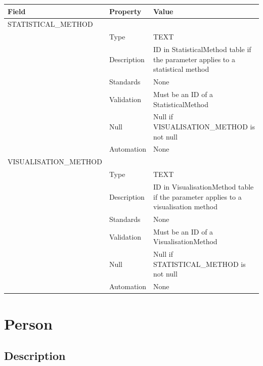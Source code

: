 \begin{longtable}[]{@{}
  >{\raggedright\arraybackslash}p{}
  >{\raggedright\arraybackslash}p{}
  >{\raggedright\arraybackslash}p{}@{}}
\toprule\noalign{}
\begin{minipage}[b]{\linewidth}\raggedright
Field
\end{minipage} & \begin{minipage}[b]{\linewidth}\raggedright
Property
\end{minipage} & \begin{minipage}[b]{\linewidth}\raggedright
Value
\end{minipage} \\
\midrule\noalign{}
\endhead
\bottomrule\noalign{}
\endlastfoot
STATISTICAL\_METHOD & & \\
& Type & TEXT \\
& Description & ID in StatisticalMethod table if the parameter applies
to a statistical method \\
& Standards & None \\
& Validation & Must be an ID of a StatisticalMethod \\
& Null & Null if VISUALISATION\_METHOD is not null \\
& Automation & None \\
VISUALISATION\_METHOD & & \\
& Type & TEXT \\
& Description & ID in VisualisationMethod table if the parameter applies
to a visualisation method \\
& Standards & None \\
& Validation & Must be an ID of a VisualisationMethod \\
& Null & Null if STATISTICAL\_METHOD is not null \\
& Automation & None \\
\end{longtable}

\section{Person}\label{person}

\subsection{Description}\label{description-20}

